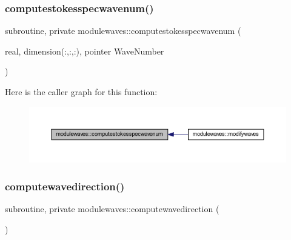 \mbox{\label{namespacemodulewaves_ad109b1bb3a215d9d37fee5e04428decc}} 
\subsubsection{\texorpdfstring{computestokesspecwavenum()}{computestokesspecwavenum()}}
{\footnotesize\ttfamily subroutine, private modulewaves\+::computestokesspecwavenum (\begin{DoxyParamCaption}\item[{real, dimension(\+:,\+:,\+:), pointer}]{Wave\+Number }\end{DoxyParamCaption})\hspace{0.3cm}{\ttfamily [private]}}

Here is the caller graph for this function\+:\nopagebreak
\begin{figure}[H]
\begin{center}
\leavevmode
\includegraphics[width=350pt]{namespacemodulewaves_ad109b1bb3a215d9d37fee5e04428decc_icgraph}
\end{center}
\end{figure}
\mbox{\label{namespacemodulewaves_ad48d7252dffb5d91c6b1bd578279b9f6}} 
\subsubsection{\texorpdfstring{computewavedirection()}{computewavedirection()}}
{\footnotesize\ttfamily subroutine, private modulewaves\+::computewavedirection (\begin{DoxyParamCaption}{ }\end{DoxyParamCaption})\hspace{0.3cm}{\ttfamily [private]}}

